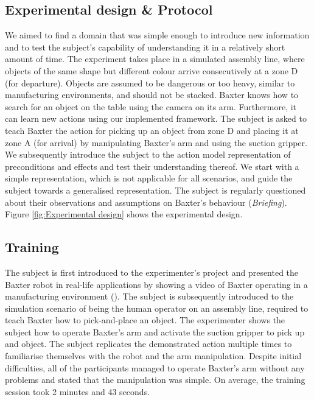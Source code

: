 \subsection{Experimental design \& Protocol}
We aimed to find a domain that was simple enough to introduce new information and to test the subject's capability of understanding it in a relatively short amount of time. The experiment takes place in a simulated assembly line, where objects of the same shape but different colour arrive consecutively at a zone D (for departure). Objects are assumed to be dangerous or too heavy, similar to manufacturing environments, and should not be stacked. Baxter knows how to search for an object on the table using the camera on its arm. Furthermore, it can learn new actions using our implemented framework. The subject is asked to teach Baxter the action for picking up an object from zone D and placing it at zone A (for arrival) by manipulating Baxter's arm and using the suction gripper. We subsequently introduce the subject to the action model representation of preconditions and effects and test their understanding thereof. We start with a simple representation, which is not applicable for all scenarios, and guide the subject towards a generalised representation. The subject is regularly questioned about their observations and assumptions on Baxter's behaviour (\textit{Briefing}).
Figure \ref{fig:Experimental design} shows the experimental design.


\subsection{Training}
The subject is first introduced to the experimenter's project and presented the Baxter robot in real-life applications by showing a video of Baxter operating in a manufacturing environment (\cite{BaxterYoutube}). The subject is subsequently introduced to the simulation scenario of being the human operator on an assembly line, required to teach Baxter how to pick-and-place an object. The experimenter shows the subject how to operate Baxter's arm and activate the suction gripper to pick up and object. The subject replicates the demonstrated action multiple times to familiarise themselves with the robot and the arm manipulation. Despite initial difficulties, all of the participants managed to operate Baxter's arm without any problems and stated that the manipulation was simple. On average, the training session took 2 minutes and 43 seconds.

